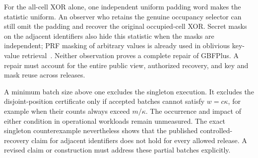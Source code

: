 For the all-cell XOR alone, one independent uniform padding word makes the
statistic uniform. An observer who retains the genuine occupancy selector
can still omit the padding and recover the original occupied-cell XOR.
Secret masks on the adjacent identifiers also hide this statistic when the
masks are independent; PRF masking of arbitrary values is already used in
oblivious key-value retrieval~\cite{hao2024okvr}. Neither observation proves
a complete repair of GBFPlus. A repair must account for the entire public view,
authorized recovery, and key and mask reuse across releases.

A minimum batch size above one excludes the singleton execution. It excludes
the disjoint-position certificate only if accepted batches cannot satisfy
$w=c\kappa$, for example when their counts always exceed $m/\kappa$.
The occurrence and impact of either condition in operational workloads remain
unmeasured. The exact singleton counterexample nevertheless shows that the
published controlled-recovery claim for adjacent identifiers does not hold
for every allowed release. A revised claim or construction must address these
partial batches explicitly.
